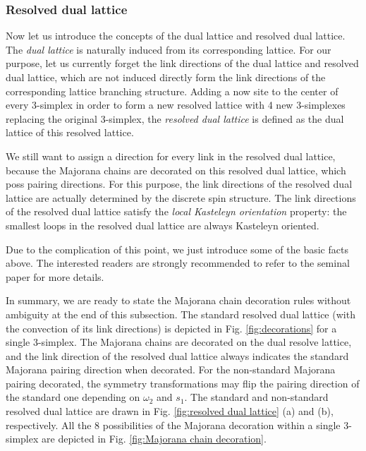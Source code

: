 \documentclass[%
 reprint,
 amsmath,amssymb,
 aps,
prb,
]{revtex4-2}
\begin{document}
\subsubsection{Resolved dual lattice}

Now let us introduce the concepts of the dual lattice and resolved dual lattice.
The \textit{dual lattice} is naturally induced from its corresponding lattice.
For our purpose, let us currently forget the link directions of the dual lattice and resolved dual lattice, which are not induced directly form the link directions of the corresponding lattice branching structure.
Adding a now site to the center of every 3-simplex in order to form a new resolved lattice with 4 new 3-simplexes replacing the original 3-simplex, the \textit{resolved dual lattice} is defined as the dual lattice of this resolved lattice.

We still want to assign a direction for every link in the resolved dual lattice, because the Majorana chains are decorated on this resolved dual lattice, which poss pairing directions.
For this purpose, the link directions of the resolved dual lattice are actually determined by the discrete spin structure.
The link directions of the resolved dual lattice satisfy the \textit{local Kasteleyn orientation} property: the smallest loops in the resolved dual lattice are always Kasteleyn oriented.

Due to the complication of this point, we just introduce some of the basic facts above.
The interested readers are strongly recommended to refer to the seminal paper \cite{Wang2018} for more details.

In summary, we are ready to state the Majorana chain decoration rules without ambiguity at the end of this subsection.
The standard resolved dual lattice (with the convection of its link directions) is depicted in Fig. \ref{fig:decorations} for a single 3-simplex.
The Majorana chains are decorated on the dual resolve lattice, and the link direction of the resolved dual lattice always indicates the standard Majorana pairing direction when decorated.
For the non-standard Majorana pairing decorated, the symmetry transformations may flip the pairing direction of the standard one depending on $\omega_2$ and $s_1$.
The standard and non-standard resolved dual lattice are drawn in Fig. \ref{fig:resolved dual lattice} (a) and (b), respectively.
All the 8 possibilities of the Majorana decoration within a single 3-simplex are depicted in Fig. \ref{fig:Majorana chain decoration}.
\end{document}

